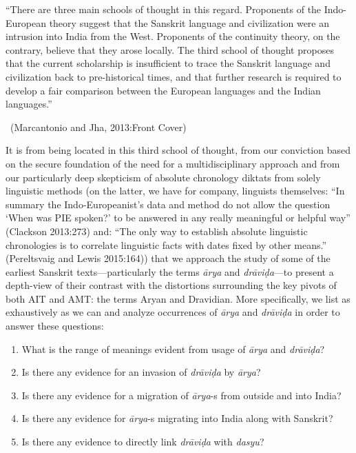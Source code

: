 \begin{myquote}
“There are three main schools of thought in this regard. Proponents of the Indo-European theory suggest that the Sanskrit language and civilization were an intrusion into India from the West. Proponents of the continuity theory, on the contrary, believe that they arose locally. The third school of thought proposes that the current scholarship is insufficient to trace the Sanskrit language and civilization back to pre-historical times, and that further research is required to develop a fair comparison between the European languages and the Indian languages.”

~\hfill (Marcantonio and Jha, 2013:Front Cover)
\end{myquote}

It is from being located in this third school of thought, from our conviction based on the secure foundation of the need for a multidisciplinary approach and from our particularly deep skepticism of absolute chronology diktats from solely linguistic methods (on the latter, we have for company, linguists themselves: “In summary the Indo-Europeanist’s data and method do not allow the question ‘When was PIE spoken?’ to be answered in any really meaningful or helpful way” (Clackson 2013:273) and: “The only way to establish absolute linguistic chronologies is to correlate linguistic facts with dates fixed by other means.” (Pereltsvaig and Lewis 2015:164)) that we approach the study of some of the earliest Sanskrit texts—particularly the terms \textit{ārya} and \textit{drāviḍa}—to present a depth-view of their contrast with the distortions surrounding the key pivots of both AIT and AMT: the terms Aryan and Dravidian. More specifically, we list as exhaustively as we can and analyze occurrences of \textit{ārya} and \textit{drāviḍa }in order to answer these questions: 

\newpage

\begin{enumerate}
\itemsep=1pt
\item What is the range of meanings evident from usage of \textit{ārya} and \textit{drāviḍa}?

 \item Is there any evidence for an invasion of \textit{drāviḍa }by \textit{ārya}?

 \item Is there any evidence for a migration of \textit{ārya}-s from outside and into India?

 \item Is there any evidence for \textit{ārya}-s migrating into India along with Sanskrit?

 \item Is there any evidence to directly link \textit{drāviḍa }with \textit{dasyu}? 

\end{enumerate}

